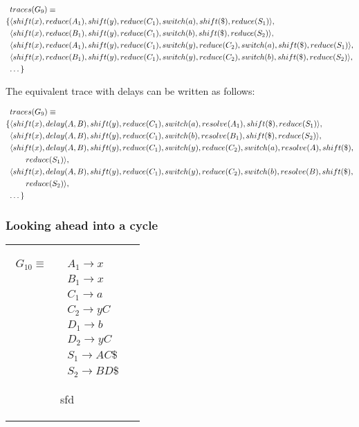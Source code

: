 \documentclass[11pt]{article}
\begin{document}
\parbox{.3\textwidth}{\begin{align*}
&traces(G_9) \equiv \\
\{ & \langle shift(x), reduce(A_1), shift(y), reduce(C_1), switch(a), shift(\$), reduce(S_1) \rangle,\\
   & \langle shift(x), reduce(B_1), shift(y), reduce(C_1), switch(b), shift(\$), reduce(S_2) \rangle,\\
   & \langle shift(x), reduce(A_1), shift(y), reduce(C_1), switch(y), reduce(C_2), switch(a), shift(\$), reduce(S_1) \rangle,\\
   & \langle shift(x), reduce(B_1), shift(y), reduce(C_1), switch(y), reduce(C_2), switch(b), shift(\$), reduce(S_2) \rangle,\\
   & \textellipsis \}
\end{align*}}

The equivalent trace with delays can be written as follows:

\parbox{.3\textwidth}{\begin{align*}
&traces(G_9) \equiv \\
\{ & \langle shift(x), delay(A,B), shift(y), reduce(C_1), switch(a), resolve(A_1), shift(\$), reduce(S_1) \rangle,\\
   & \langle shift(x), delay(A,B), shift(y), reduce(C_1), switch(b), resolve(B_1), shift(\$), reduce(S_2) \rangle,\\
   & \langle shift(x), delay(A,B), shift(y), reduce(C_1), switch(y), reduce(C_2), switch(a), resolve(A), shift(\$), \\&\qquad reduce(S_1) \rangle,\\
   & \langle shift(x), delay(A,B), shift(y), reduce(C_1), switch(y), reduce(C_2), switch(b), resolve(B), shift(\$), \\&\qquad reduce(S_2) \rangle,\\
   & \textellipsis \}
\end{align*}}



\subsubsection{Looking ahead into a cycle}
\begin{tabular}[t]{cl}
\parbox{.3\textwidth}{
\begin{align*}
G_{10} \equiv \quad & A_1 \rightarrow x\\
                  & B_1 \rightarrow x\\
                  & C_1 \rightarrow a\\
                  & C_2 \rightarrow y C\\
                  & D_1 \rightarrow b\\
                  & D_2 \rightarrow y C\\
                  & S_1 \rightarrow A C \$\\
                  & S_2 \rightarrow B D \$
\end{align*}}
\parbox{.8\textwidth}{sfd}
\end{tabular}
\end{document}
